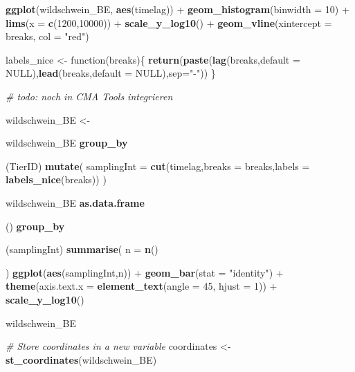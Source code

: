 \documentclass[]{book}
\newenvironment{Shaded}{\begin{snugshade}}{\end{snugshade}}
\newcommand{\KeywordTok}[1]{\textcolor[rgb]{0.13,0.29,0.53}{\textbf{{#1}}}}
\newcommand{\DataTypeTok}[1]{\textcolor[rgb]{0.13,0.29,0.53}{{#1}}}
\newcommand{\DecValTok}[1]{\textcolor[rgb]{0.00,0.00,0.81}{{#1}}}
\newcommand{\StringTok}[1]{\textcolor[rgb]{0.31,0.60,0.02}{{#1}}}
\newcommand{\CommentTok}[1]{\textcolor[rgb]{0.56,0.35,0.01}{\textit{{#1}}}}
\newcommand{\OtherTok}[1]{\textcolor[rgb]{0.56,0.35,0.01}{{#1}}}
\newcommand{\NormalTok}[1]{{#1}}
\theoremstyle{definition}
\theoremstyle{definition}
\theoremstyle{definition}
\theoremstyle{remark}
\begin{document}
\begin{Shaded}
\begin{Highlighting}[]
{{{{\KeywordTok{ggplot}\NormalTok{(wildschwein_BE, }\KeywordTok{aes}\NormalTok{(timelag)) +}
\StringTok{  }\KeywordTok{geom_histogram}\NormalTok{(}\DataTypeTok{binwidth =} \DecValTok{10}\NormalTok{) +}
\StringTok{  }\KeywordTok{lims}\NormalTok{(}\DataTypeTok{x =} \KeywordTok{c}\NormalTok{(}\DecValTok{1200}\NormalTok{,}\DecValTok{10000}\NormalTok{)) +}
\StringTok{  }\KeywordTok{scale_y_log10}\NormalTok{() +}
\StringTok{  }\KeywordTok{geom_vline}\NormalTok{(}\DataTypeTok{xintercept =} \NormalTok{breaks, }\DataTypeTok{col =} \StringTok{"red"}\NormalTok{)}

\NormalTok{labels_nice <-}\StringTok{ }\NormalTok{function(breaks)\{}
  \KeywordTok{return}\NormalTok{(}\KeywordTok{paste}\NormalTok{(}\KeywordTok{lag}\NormalTok{(breaks,}\DataTypeTok{default =} \OtherTok{NULL}\NormalTok{),}\KeywordTok{lead}\NormalTok{(breaks,}\DataTypeTok{default =} \OtherTok{NULL}\NormalTok{),}\DataTypeTok{sep=}\StringTok{"-"}\NormalTok{))}
\NormalTok{\}}

\CommentTok{# todo: noch in CMA Tools integrieren}


\NormalTok{wildschwein_BE <-}\StringTok{ }\NormalTok{wildschwein_BE %
\StringTok{  }\KeywordTok{group_by}\NormalTok{(TierID) %
\StringTok{  }\KeywordTok{mutate}\NormalTok{(}
    \DataTypeTok{samplingInt =} \KeywordTok{cut}\NormalTok{(timelag,}\DataTypeTok{breaks =} \NormalTok{breaks,}\DataTypeTok{labels =} \KeywordTok{labels_nice}\NormalTok{(breaks))}
  \NormalTok{) }

\NormalTok{wildschwein_BE %
\StringTok{  }\KeywordTok{as.data.frame}\NormalTok{() %
\StringTok{  }\KeywordTok{group_by}\NormalTok{(samplingInt) %
\StringTok{  }\KeywordTok{summarise}\NormalTok{(}
    \DataTypeTok{n =} \KeywordTok{n}\NormalTok{()}
  \NormalTok{) %
\StringTok{  }\KeywordTok{ggplot}\NormalTok{(}\KeywordTok{aes}\NormalTok{(samplingInt,n)) +}
\StringTok{  }\KeywordTok{geom_bar}\NormalTok{(}\DataTypeTok{stat =} \StringTok{"identity"}\NormalTok{) +}
\StringTok{  }\KeywordTok{theme}\NormalTok{(}\DataTypeTok{axis.text.x =} \KeywordTok{element_text}\NormalTok{(}\DataTypeTok{angle =} \DecValTok{45}\NormalTok{, }\DataTypeTok{hjust =} \DecValTok{1}\NormalTok{)) +}
\StringTok{  }\KeywordTok{scale_y_log10}\NormalTok{()}



\NormalTok{wildschwein_BE}

\CommentTok{# Store coordinates in a new variable}
\NormalTok{coordinates <-}\StringTok{ }\KeywordTok{st_coordinates}\NormalTok{(wildschwein_BE)}

}}}}}}}}}}
\end{Highlighting}
\end{Shaded}
\end{document}
